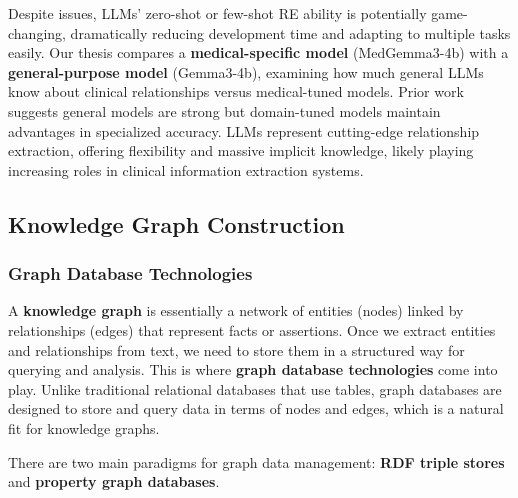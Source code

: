 Despite issues, LLMs' zero-shot or few-shot RE ability is potentially game-changing, dramatically reducing development time and adapting to multiple tasks easily. Our thesis compares a \textbf{medical-specific model} (MedGemma3-4b) with a \textbf{general-purpose model} (Gemma3-4b), examining how much general LLMs know about clinical relationships versus medical-tuned models. Prior work suggests general models are strong but domain-tuned models maintain advantages in specialized accuracy. LLMs represent cutting-edge relationship extraction, offering flexibility and massive implicit knowledge, likely playing increasing roles in clinical information extraction systems.

\subsection{Knowledge Graph Construction}

\subsubsection{Graph Database Technologies}

A \textbf{knowledge graph} is essentially a network of entities (nodes) linked by relationships (edges) that represent facts or assertions. Once we extract entities and relationships from text, we need to store them in a structured way for querying and analysis. This is where \textbf{graph database technologies} come into play. Unlike traditional relational databases that use tables, graph databases are designed to store and query data in terms of nodes and edges, which is a natural fit for knowledge graphs.

There are two main paradigms for graph data management: \textbf{RDF triple stores} and \textbf{property graph databases}.

